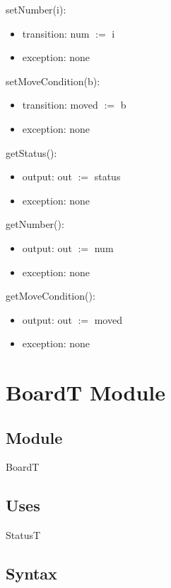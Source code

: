 \documentclass[12pt]{article}
\begin{document}
\noindent setNumber(i):

\begin{itemize}
  \item transition: num $:=$ i
  \item exception: none
\end{itemize}

\noindent setMoveCondition(b):

\begin{itemize}
  \item transition: moved $:=$ b
  \item exception: none
\end{itemize}

\noindent getStatus():

\begin{itemize}
  \item output: out $:=$ status
  \item exception: none
\end{itemize}

\noindent getNumber():

\begin{itemize}
  \item output: out $:=$ num
  \item exception: none
\end{itemize}

\noindent getMoveCondition():

\begin{itemize}
  \item output: out $:=$ moved
  \item exception: none
\end{itemize}


\newpage

\section* {BoardT Module}

\subsection* {Module}

BoardT

\subsection*{Uses}

StatusT

\subsection* {Syntax}
\end{document}
